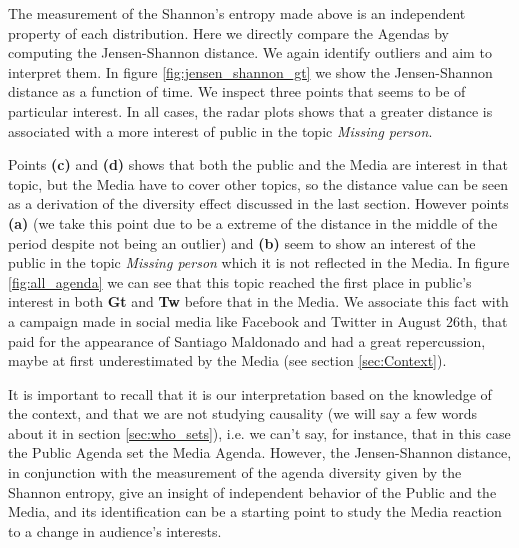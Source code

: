 \par The measurement of the Shannon's entropy made above is an independent property of each distribution. 
Here we directly compare the Agendas by computing the Jensen-Shannon distance. We again identify outliers and aim to interpret them.
In figure \ref{fig:jensen_shannon_gt} we show the Jensen-Shannon distance as a function of time. We inspect three points that seems to be of particular interest. In all cases, the radar plots shows that a greater distance is associated with a more interest of public in the topic \emph{Missing person}. 
\par Points \textbf{(c)} and \textbf{(d)} shows that both the public and the Media are interest in that topic, but the Media have to cover other topics, so the distance value can be seen as a derivation of the diversity effect discussed in the last section.
However points \textbf{(a)} (we take this point due to be a extreme of the distance in the middle of the period despite not being an outlier) and \textbf{(b)} seem to show an interest of the public in the topic \emph{Missing person} which it is not reflected in the Media. 
In figure \ref{fig:all_agenda} we can see that this topic reached the first place in public's interest in both \textbf{Gt} and \textbf{Tw} before that in the Media. We associate this fact with a campaign made in social media like Facebook and Twitter in August 26th, that paid for the appearance of Santiago Maldonado and had a great repercussion, maybe at first underestimated by the Media (see section \ref{sec:Context}). 
\par It is important to recall that it is our interpretation based on the knowledge of the context, and that we are not studying causality (we will say a few words about it in section \ref{sec:who_sets}), i.e. we can't say, for instance, that in this case the Public Agenda set the Media Agenda. 
However, the Jensen-Shannon distance, in conjunction with the measurement of the agenda diversity given by the Shannon entropy, give an insight of independent behavior of the Public and the Media, and its identification can be a starting point to study the Media reaction to a change in audience's interests.
 
